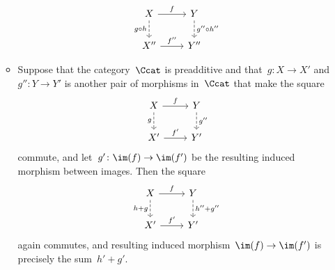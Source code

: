 \begin{remark*}
\begin{enumerate}
\begin{itemize}
          \[
            \begin{tikzcd}
                X
                \arrow{r}[above]{f}
                \arrow[dashed]{d}[left]{g \circ h}
              & Y
                \arrow[dashed]{d}[right]{g'' \circ h''}
              \\
                X''
                \arrow{r}[above]{f''}
              & Y''
            \end{tikzcd}
          \]
        \item
          Suppose that the category~$\Ccat$ is preadditive and that~$g \colon X \to X'$ and~$g'' \colon Y \to Y'$ is another pair of morphisms in~$\Ccat$ that make the square
          \[
            \begin{tikzcd}
                X
                \arrow{r}[above]{f}
                \arrow[dashed]{d}[left]{g}
              & Y
                \arrow[dashed]{d}[right]{g''}
              \\
                X'
                \arrow{r}[above]{f'}
              & Y'
            \end{tikzcd}
          \]
          commute, and let~$g' \colon \im(f) \to \im(f')$ be the resulting induced morphism between images.
          Then the square
          \[
            \begin{tikzcd}
                X
                \arrow{r}[above]{f}
                \arrow[dashed]{d}[left]{h + g}
              & Y
                \arrow[dashed]{d}[right]{h'' + g''}
              \\
                X'
                \arrow{r}[above]{f'}
              & Y'
            \end{tikzcd}
          \]
          again commutes, and resulting induced morphism~$\im(f) \to \im(f')$ is precisely the sum~$h' + g'$.

\end{itemize}
\end{enumerate}
\end{remark*}
